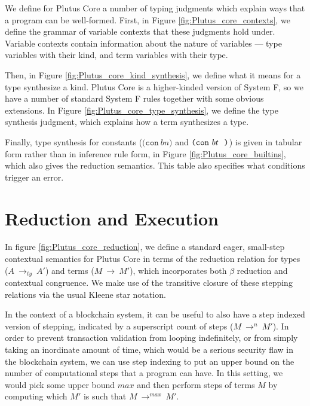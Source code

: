 \documentclass[a4paper]{article}
\newcommand{\keyword}[1]{\texttt{#1}}
\newcommand{\construct}[1]{\texttt{(} #1 \texttt{)}}
\newcommand{\con}[1]{\construct{\keyword{con} ~ #1}}
\newcommand{\conT}[2]{\construct{\keyword{con} ~ #1 ~ #2}}
\newcommand{\typeStep}[2]{#1 ~ \rightarrow_{ty} ~ #2}
\newcommand{\step}[2]{#1 ~ \rightarrow ~ #2}
\newcommand{\multistepIndexed}[3]{#1 ~ \rightarrow^{#2} ~ #3}
\begin{document}
We define for Plutus Core a number of typing judgments which explain ways that a program can be well-formed. First, in Figure \ref{fig:Plutus_core_contexts}, we define the grammar of variable contexts that these judgments hold under. Variable contexts contain information about the nature of variables --- type variables with their kind, and term variables with their type.

Then, in Figure \ref{fig:Plutus_core_kind_synthesis}, we define what it means for a type synthesize a kind. Plutus Core is a higher-kinded version of System F, so we have a number of standard System F rules together with some obvious extensions. In Figure \ref{fig:Plutus_core_type_synthesis}, we define the type synthesis judgment, which explains how a term synthesizes a type.

Finally, type synthesis for constants ($\con{bn}$ and $\conT{bt}$) is given in tabular form rather than in inference rule form, in Figure \ref{fig:Plutus_core_builtins}, which also gives the reduction semantics. This table also specifies what conditions trigger an error.
















\section{Reduction and Execution}

In figure \ref{fig:Plutus_core_reduction}, we define a standard eager,
small-step contextual semantics for Plutus Core in terms of the
reduction relation for types (\(\typeStep{A}{A'}\)) and terms
(\(\step{M}{M'}\)), which incorporates both $\beta$ reduction and
contextual congruence. We make use of the transitive closure of these
stepping relations via the usual Kleene star notation.


In the context of a blockchain system, it can be useful to also have a
step indexed version of stepping, indicated by a superscript count of
steps (\(\multistepIndexed{M}{n}{M'}\)). In order to prevent
transaction validation from looping indefinitely, or from simply
taking an inordinate amount of time, which would be a serious security
flaw in the blockchain system, we can use step indexing to put an
upper bound on the number of computational steps that a program can
have. In this setting, we would pick some upper bound $\mathit{max}$
and then perform steps of terms $M$ by computing which $M'$ is such
that \(\multistepIndexed{M}{\mathit{max}}{M'}\).
\end{document}
